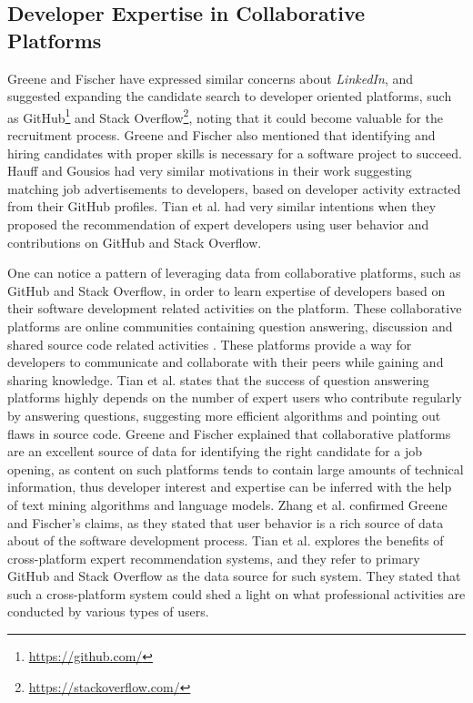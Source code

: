         \subsection{Developer Expertise in Collaborative Platforms}
            Greene and Fischer \cite{greene2016cvexplorer} have expressed similar concerns about \emph{LinkedIn}, and suggested expanding the candidate search to developer oriented platforms, such as GitHub\footnote{\url{https://github.com/}} and Stack Overflow\footnote{\url{https://stackoverflow.com/}}, noting that it could become valuable for the recruitment process. Greene and Fischer also mentioned that identifying and hiring candidates with proper skills is necessary for a software project to succeed. Hauff and Gousios \cite{hauff2015matching} had very similar motivations in their work suggesting matching job advertisements to developers, based on developer activity extracted from their GitHub profiles. Tian et al. \cite{tian2019geek} had very similar intentions when they proposed the recommendation of expert developers using user behavior and contributions on GitHub and Stack Overflow.
            
            One can notice a pattern of leveraging data from collaborative platforms, such as GitHub and Stack Overflow, in order to learn expertise of developers based on their software development related activities on the platform. These collaborative platforms are online communities containing question answering, discussion and shared source code related activities \cite{wang2018survey}. These platforms provide a way for developers to communicate and collaborate with their peers while gaining and sharing knowledge. Tian et al. \cite{tian2019geek} states that the success of question answering platforms highly depends on the number of expert users who contribute regularly by answering questions, suggesting more efficient algorithms and pointing out flaws in source code. Greene and Fischer \cite{greene2016cvexplorer} explained that collaborative platforms are an excellent source of data for identifying the right candidate for a job opening, as content on such platforms tends to contain large amounts of technical information, thus developer interest and expertise can be inferred with the help of text mining algorithms and language models. Zhang et al. \cite{zhang2014recommending} confirmed Greene and Fischer's claims, as they stated that user behavior is a rich source of data about of the software development process. Tian et al. \cite{tian2019geek} explores the benefits of cross-platform expert recommendation systems, and they refer to primary GitHub and Stack Overflow as the data source for such system. They stated that such a cross-platform system could shed a light on what professional activities are conducted by various types of users. 
            
